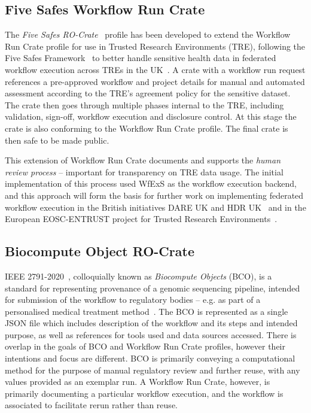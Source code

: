 \subsection{Five Safes Workflow Run Crate}\label{wrroc:trusted-workflow-run-crate}

The \emph{Five Safes RO-Crate}~\cite{5s-crate} profile has been developed to extend the Workflow Run Crate profile for use in Trusted Research Environments (TRE), following the Five Safes Framework~\cite{Desai 2016} to better handle sensitive health data in federated workflow execution across TREs in the UK~\cite{trefx}.
A crate with a workflow run request references a pre-approved workflow and project details for manual and automated assessment according to the TRE's agreement policy for the sensitive dataset.
%
The crate then goes through multiple phases internal to the TRE, including validation, sign-off, workflow execution and disclosure control.
At this stage the crate is also conforming to the Workflow Run Crate profile.
The final crate is then safe to be made public.

This extension of Workflow Run Crate documents and supports the \emph{human review process} -- important for transparency on TRE data usage. 
The initial implementation of this process used WfExS as the workflow execution backend, and this approach will form the basis for further work on implementing federated workflow execution in the British initiatives DARE UK and HDR UK~\cite{Snowley 2023} and in the European EOSC-ENTRUST project for Trusted Research Environments~\cite{eosc-entrust}.


\subsection{Biocompute Object RO-Crate}\label{wrroc:bco-crate}
IEEE 2791-2020~\cite{Mazumder 2020}, colloquially known as \emph{Biocompute Objects} (BCO), is a standard for representing provenance of a genomic sequencing pipeline, intended for submission of the workflow to regulatory bodies -- e.g. as part of a personalised medical treatment method~\cite{Alterovitz 2018}.
The BCO is represented as a single JSON file which includes description of the workflow and its steps and intended purpose, as well as references for tools used and data sources accessed. 
There is overlap in the goals of BCO and Workflow Run Crate profiles, however their intentions and focus are different. 
BCO is primarily conveying a computational method for the purpose of manual regulatory review and further reuse, with any values provided as an exemplar run.  
A Workflow Run Crate, however, is primarily documenting a particular workflow execution, and the workflow is associated to facilitate rerun rather than reuse. 

